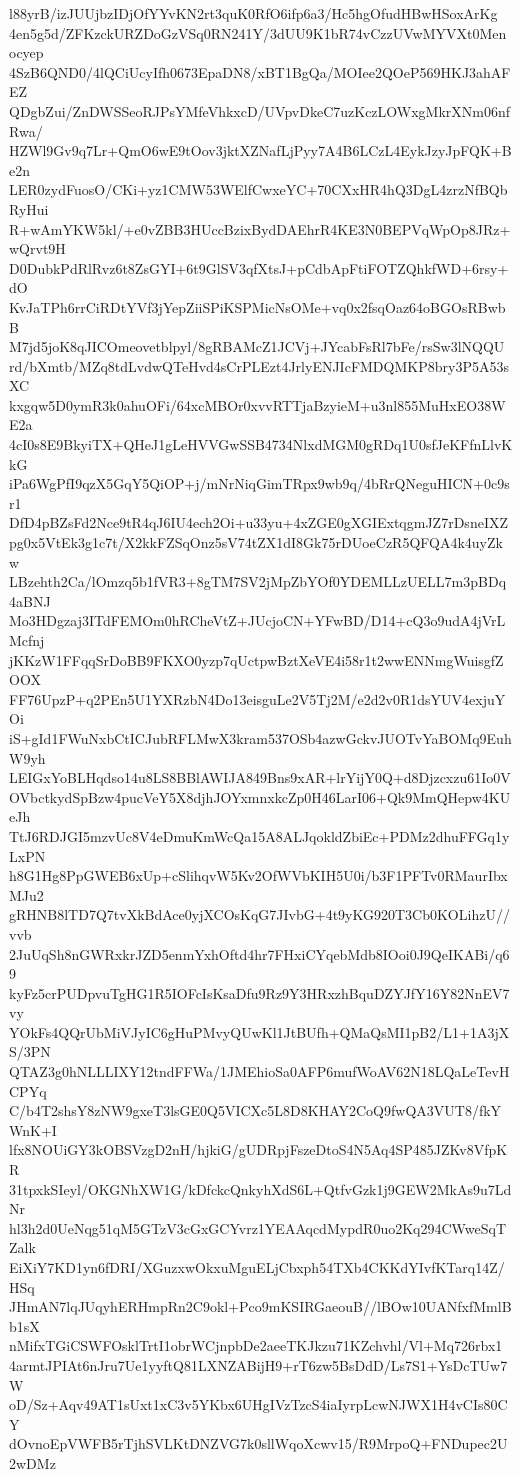 l88yrB/izJUUjbzIDjOfYYvKN2rt3quK0RfO6ifp6a3/Hc5hgOfudHBwHSoxArKg
4en5g5d/ZFKzckURZDoGzVSq0RN241Y/3dUU9K1bR74vCzzUVwMYVXt0Menocyep
4SzB6QND0/4lQCiUcyIfh0673EpaDN8/xBT1BgQa/MOIee2QOeP569HKJ3ahAFEZ
QDgbZui/ZnDWSSeoRJPsYMfeVhkxcD/UVpvDkeC7uzKczLOWxgMkrXNm06nfRwa/
HZWl9Gv9q7Lr+QmO6wE9tOov3jktXZNafLjPyy7A4B6LCzL4EykJzyJpFQK+Be2n
LER0zydFuosO/CKi+yz1CMW53WElfCwxeYC+70CXxHR4hQ3DgL4zrzNfBQbRyHui
R+wAmYKW5kl/+e0vZBB3HUccBzixBydDAEhrR4KE3N0BEPVqWpOp8JRz+wQrvt9H
D0DubkPdRlRvz6t8ZsGYI+6t9GlSV3qfXtsJ+pCdbApFtiFOTZQhkfWD+6rsy+dO
KvJaTPh6rrCiRDtYVf3jYepZiiSPiKSPMicNsOMe+vq0x2fsqOaz64oBGOsRBwbB
M7jd5joK8qJICOmeovetblpyl/8gRBAMcZ1JCVj+JYcabFsRl7bFe/rsSw3lNQQU
rd/bXmtb/MZq8tdLvdwQTeHvd4sCrPLEzt4JrlyENJIcFMDQMKP8bry3P5A53sXC
kxgqw5D0ymR3k0ahuOFi/64xcMBOr0xvvRTTjaBzyieM+u3nl855MuHxEO38WE2a
4cI0s8E9BkyiTX+QHeJ1gLeHVVGwSSB4734NlxdMGM0gRDq1U0sfJeKFfnLlvKkG
iPa6WgPfI9qzX5GqY5QiOP+j/mNrNiqGimTRpx9wb9q/4bRrQNeguHICN+0c9sr1
DfD4pBZsFd2Nce9tR4qJ6IU4ech2Oi+u33yu+4xZGE0gXGIExtqgmJZ7rDsneIXZ
pg0x5VtEk3g1c7t/X2kkFZSqOnz5sV74tZX1dI8Gk75rDUoeCzR5QFQA4k4uyZkw
LBzehth2Ca/lOmzq5b1fVR3+8gTM7SV2jMpZbYOf0YDEMLLzUELL7m3pBDq4aBNJ
Mo3HDgzaj3ITdFEMOm0hRCheVtZ+JUcjoCN+YFwBD/D14+cQ3o9udA4jVrLMcfnj
jKKzW1FFqqSrDoBB9FKXO0yzp7qUctpwBztXeVE4i58r1t2wwENNmgWuisgfZOOX
FF76UpzP+q2PEn5U1YXRzbN4Do13eisguLe2V5Tj2M/e2d2v0R1dsYUV4exjuYOi
iS+gId1FWuNxbCtICJubRFLMwX3kram537OSb4azwGckvJUOTvYaBOMq9EuhW9yh
LEIGxYoBLHqdso14u8LS8BBlAWIJA849Bns9xAR+lrYijY0Q+d8Djzcxzu61Io0V
OVbctkydSpBzw4pucVeY5X8djhJOYxmnxkcZp0H46LarI06+Qk9MmQHepw4KUeJh
TtJ6RDJGI5mzvUc8V4eDmuKmWcQa15A8ALJqokldZbiEc+PDMz2dhuFFGq1yLxPN
h8G1Hg8PpGWEB6xUp+cSlihqvW5Kv2OfWVbKIH5U0i/b3F1PFTv0RMaurIbxMJu2
gRHNB8lTD7Q7tvXkBdAce0yjXCOsKqG7JIvbG+4t9yKG920T3Cb0KOLihzU//vvb
2JuUqSh8nGWRxkrJZD5enmYxhOftd4hr7FHxiCYqebMdb8IOoi0J9QeIKABi/q69
kyFz5crPUDpvuTgHG1R5IOFcIsKsaDfu9Rz9Y3HRxzhBquDZYJfY16Y82NnEV7vy
YOkFs4QQrUbMiVJyIC6gHuPMvyQUwKl1JtBUfh+QMaQsMI1pB2/L1+1A3jXS/3PN
QTAZ3g0hNLLLIXY12tndFFWa/1JMEhioSa0AFP6mufWoAV62N18LQaLeTevHCPYq
C/b4T2shsY8zNW9gxeT3lsGE0Q5VICXc5L8D8KHAY2CoQ9fwQA3VUT8/fkYWnK+I
lfx8NOUiGY3kOBSVzgD2nH/hjkiG/gUDRpjFszeDtoS4N5Aq4SP485JZKv8VfpKR
31tpxkSIeyl/OKGNhXW1G/kDfckcQnkyhXdS6L+QtfvGzk1j9GEW2MkAs9u7LdNr
hl3h2d0UeNqg51qM5GTzV3cGxGCYvrz1YEAAqcdMypdR0uo2Kq294CWweSqTZalk
EiXiY7KD1yn6fDRI/XGuzxwOkxuMguELjCbxph54TXb4CKKdYIvfKTarq14Z/HSq
JHmAN7lqJUqyhERHmpRn2C9okl+Pco9mKSIRGaeouB//lBOw10UANfxfMmlBb1sX
nMifxTGiCSWFOsklTrtI1obrWCjnpbDe2aeeTKJkzu71KZchvhl/Vl+Mq726rbx1
4armtJPIAt6nJru7Ue1yyftQ81LXNZABijH9+rT6zw5BsDdD/Ls7S1+YsDcTUw7W
oD/Sz+Aqv49AT1sUxt1xC3v5YKbx6UHgIVzTzcS4iaIyrpLcwNJWX1H4vCIs80CY
dOvnoEpVWFB5rTjhSVLKtDNZVG7k0sllWqoXcwv15/R9MrpoQ+FNDupec2U2wDMz
